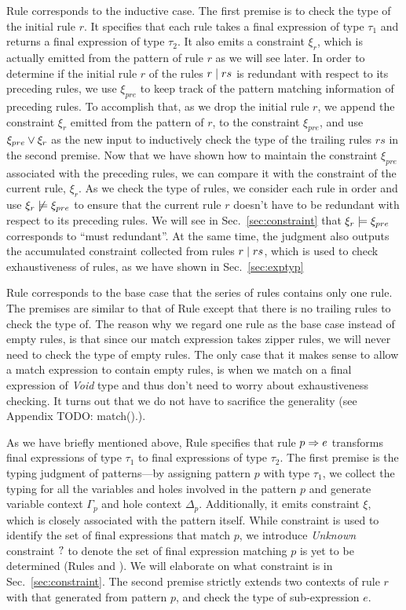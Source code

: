 \documentclass[runningheads,envcountsame,a4paper]{llncs}
\newcommand{\todo}[1]{{\color{red} TODO: #1}}
\begin{document}
Rule \TRules corresponds to the inductive case. The first premise is to check
the type of the initial rule $r$. It specifies that each rule takes a final expression
of type $\tau_1$ and returns a final expression of type $\tau_2$. It also emits
a constraint $\xi_r$, which is actually emitted from the pattern of rule $r$ as
we will see later. In order to determine if the initial rule $r$ of the rules
$r \mid rs$ is redundant with respect to its preceding rules, we use
$\xi_{pre}$ to keep track of the pattern matching information of preceding
rules. To accomplish that, as we drop the initial rule $r$, we append the
constraint $\xi_r$ emitted from the pattern of $r$, to the constraint
$\xi_{pre}$, and use $\xi_{pre} \vee \xi_r$ as the new input to inductively check the type
of the trailing rules $rs$ in the second premise. Now that we have shown how to maintain the
constraint $\xi_{pre}$ associated with the preceding rules, we can compare it
with the constraint of the current rule, $\xi_r$. As we check the
type of rules, we consider each rule in order and use
$\xi_r \not\models \xi_{pre}$ to ensure that the current rule $r$ doesn't
have to be redundant with respect to its preceding rules. We will see in
Sec.~\ref{sec:constraint} that $\xi_r \models \xi_{pre}$ corresponds to
``must redundant''. At the same time, the judgment also outputs the accumulated
constraint collected from rules $r \mid rs$, which is used to check
exhaustiveness of rules, as we have shown in Sec.~\ref{sec:exptyp}

Rule \TOneRules corresponds to the base case that the series of rules contains
only one rule. The premises are similar to that of Rule \TRules except that
there is no trailing rules to check the type of. The reason why we regard one
rule as the base case instead of empty rules, is that since our match expression
takes zipper rules, we will never need to check the type of empty rules. The
only case that it makes sense to allow a match expression to contain empty
rules, is when we match on a final expression of \textit{Void} type and thus
don't need to worry about exhaustiveness checking. It turns out that we do not
have to sacrifice the generality (see Appendix \todo{match(){.}}).

As we have briefly mentioned above, Rule \TRule specifies that rule
$p \Rightarrow e$ transforms final expressions of type $\tau_1$ to final expressions
of type $\tau_2$. The first premise is the typing judgment of patterns---by
assigning pattern $p$ with type $\tau_1$, we collect the typing for all the
variables and holes involved in the pattern $p$ and generate variable context
$\Gamma_p$ and hole context $\Delta_p$. Additionally, it emits constraint $\xi$,
which is closely associated with the pattern itself. While constraint is used to
identify the set of final expressions that match $p$, we introduce
\textit{Unknown} constraint $\mathtt{?}$ to denote the set of final expression
matching $p$ is yet to be determined (Rules \PTEHole and \PTHole). We will elaborate on what constraint is in
Sec.~\ref{sec:constraint}. The second premise strictly extends two contexts of
rule $r$ with that generated from pattern $p$, and check the type of
sub-expression $e$.
\end{document}
